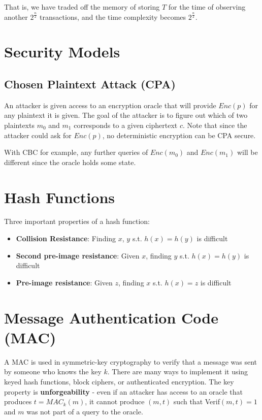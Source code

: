 \documentclass[11pt]{report}
\begin{document}
That is, we have traded off the memory of storing $T$ for the time of observing another $2^{\frac{n}{2}}$ transactions, and the time complexity becomes $2^{\frac{n}{2}}$.

\section{Security Models}
\subsection{Chosen Plaintext Attack (CPA)}
An attacker is given access to an encryption oracle that will provide $Enc(p)$ for any plaintext it is given. The goal of the attacker is to figure out which of two plaintexts $m_0$ and $m_1$ corresponds to a given ciphertext $c$. Note that since the attacker could ask for $Enc(p)$, no deterministic encryption can be CPA secure.

With CBC for example, any further queries of $Enc(m_0)$ and $Enc(m_1)$ will be different since the oracle holds some state.

\section{Hash Functions}
Three important properties of a hash function:

\begin{itemize}
	\item \textbf{Collision Resistance}: Finding $x$, $y$ s.t. $h(x) = h(y)$ is difficult
	\item \textbf{Second pre-image resistance}: Given $x$, finding $y$ s.t. $h(x) = h(y)$ is difficult
	\item \textbf{Pre-image resistance}: Given $z$, finding $x$ s.t. $h(x) = z$ is difficult
\end{itemize}


\section{Message Authentication Code (MAC)}
A MAC is used in symmetric-key cryptography to verify that a message was sent by someone who knows the key $k$. There are many ways to implement it using keyed hash functions, block ciphers, or authenticated encryption. The key property is \textbf{unforgeability} - even if an attacker has access to an oracle that produces $t = MAC_{k}(m)$, it cannot produce $(m, t)$ such that Verif$(m,t) = 1$ and $m$ was not part of a query to the oracle.
\end{document}
